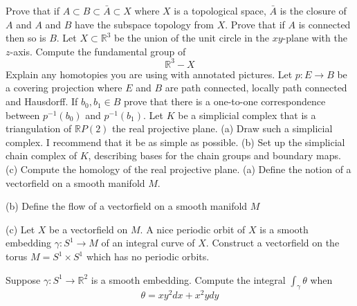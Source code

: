 \documentclass[10pt]{article}
\begin{document}
 Prove that if $A \subset B \subset \bar{A} \subset X$ where $X$ is a topological space, $\bar{A}$ is the closure of $A$ and $A$ and $B$ have the subspace topology from $X$. Prove that if $A$ is connected then so is $B$.
\newpage
 Let $X \subset \mathbb{R}^{3}$ be the union of the unit circle in the $x y$-plane with the $z$-axis. Compute the fundamental group of
$$
\mathbb{R}^{3}-X
$$
Explain any homotopies you are using with annotated pictures.
\newpage
Let $p: E \rightarrow B$ be a covering projection where $E$ and $B$ are path connected, locally path connected and Hausdorff. If $b_{0}, b_{1} \in B$ prove that there is a one-to-one correspondence between $p^{-1}\left(b_{0}\right)$ and $p^{-1}\left(b_{1}\right)$.
\newpage
Let $K$ be a simplicial complex that is a triangulation of $\mathbb{R} P(2)$ the real projective plane.
(a) Draw such a simplicial complex. I recommend that it be as simple as possible.
(b) Set up the simplicial chain complex of $K$, describing bases for the chain groups and boundary maps.
(c) Compute the homology of the real projective plane.
\newpage
(a) Define the notion of a vectorfield on a smooth manifold $M$.

(b) Define the flow of a vectorfield on a smooth manifold $M$

(c) Let $X$ be a vectorfield on $M$. A nice periodic orbit of $X$ is a smooth embedding $\gamma: S^{1} \rightarrow M$ of an integral curve of $X$. Construct a vectorfield on the torus $M=S^{1} \times S^{1}$ which has no periodic orbits.

\newpage
Suppose $\gamma: S^{1} \rightarrow \mathbb{R}^{2}$ is a smooth embedding. Compute the integral $\int_{\gamma} \theta$ when
$$
\theta=x y^{2} d x+x^{2} y d y
$$
\end{document}
